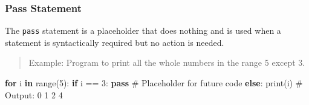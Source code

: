 \documentclass[
  letterpaper,
  DIV=11,
  numbers=noendperiod]{scrreprt}
\newenvironment{Shaded}{\begin{snugshade}}{\end{snugshade}}
\newcommand{\BuiltInTok}[1]{\textcolor[rgb]{0.00,0.23,0.31}{#1}}
\newcommand{\CommentTok}[1]{\textcolor[rgb]{0.37,0.37,0.37}{#1}}
\newcommand{\ControlFlowTok}[1]{\textcolor[rgb]{0.00,0.23,0.31}{\textbf{#1}}}
\newcommand{\DecValTok}[1]{\textcolor[rgb]{0.68,0.00,0.00}{#1}}
\newcommand{\KeywordTok}[1]{\textcolor[rgb]{0.00,0.23,0.31}{\textbf{#1}}}
\newcommand{\NormalTok}[1]{\textcolor[rgb]{0.00,0.23,0.31}{#1}}
\newcommand{\OperatorTok}[1]{\textcolor[rgb]{0.37,0.37,0.37}{#1}}
\theoremstyle{plain}
\theoremstyle{definition}
\theoremstyle{remark}
\begin{document}
\subsubsection{Pass Statement}\label{pass-statement}

The \texttt{pass} statement is a placeholder that does nothing and is
used when a statement is syntactically required but no action is needed.

\begin{quote}
Example: Program to print all the whole numbers in the range 5 except 3.
\end{quote}

\begin{Shaded}
\begin{Highlighting}[]
\ControlFlowTok{for}\NormalTok{ i }\KeywordTok{in} \BuiltInTok{range}\NormalTok{(}\DecValTok{5}\NormalTok{):}
    \ControlFlowTok{if}\NormalTok{ i }\OperatorTok{==} \DecValTok{3}\NormalTok{:}
        \ControlFlowTok{pass}  \CommentTok{\# Placeholder for future code}
    \ControlFlowTok{else}\NormalTok{:}
        \BuiltInTok{print}\NormalTok{(i)}
\CommentTok{\# Output: 0 1 2 4}
\end{Highlighting}
\end{Shaded}
\end{document}
